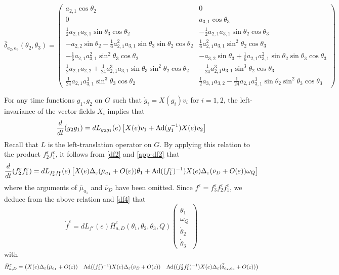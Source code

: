 \documentclass[a4paper,twoside]{article}
\def \Ad {\textnormal{Ad}}
\def \eps {\varepsilon}
\begin{document}
\begin{equation}
\label{bdelta}
 \bar \delta_{a_2,a_3}(\theta_2,\theta_3)=
\begin{pmatrix}
a_{2,1} \cos \theta_2 &  0 \\
0 & a_{3,1} \cos \theta_3 \\
\frac{1}{2} a_{2,1} a_{3,1} \sin \theta_3 \cos \theta_2  & -\frac{1}{2} a_{2,1} a_{3,1} \sin \theta_2 \cos \theta_3 \\
-a_{2,2} \sin \theta_2  -\frac{1}{6} a_{2,1}^2 a_{3,1} \sin \theta_3 \sin \theta_2 \cos \theta_2  &
\frac{1}{6} a_{2,1}^2 a_{3,1} \sin^2 \theta_2 \cos \theta_3 \\ 
-\frac{1}{6} a_{2,1} a_{3,1}^2 \sin^2 \theta_3 \cos \theta_2   & 
-a_{3,2} \sin \theta_3 + \frac{1}{6} a_{2,1}a_{3,1}^2 \sin \theta_2 \sin\theta_3 \cos \theta_3 \\
\frac{1}{2} a_{2,1} a_{2,2} +\frac{1}{24} a_{2,1}^3 a_{3,1} \sin \theta_3 \sin^2 \theta_2 \cos \theta_2 &
-\frac{1}{24} a_{2,1}^3 a_{3,1}  \sin^3 \theta_2 \cos \theta_3  \\
\frac{1}{24}  a_{2,1}a_{3,1}^3 \sin^3 \theta_3 \cos \theta_2 &
\frac{1}{2} a_{3,1} a_{3,2} -\frac{1}{24} a_{2,1} a_{3,1}^3 \sin \theta_2 \sin^2 \theta_3 \cos \theta_3 
\end{pmatrix}
\end{equation}
\vspace*{.2cm}

\noindent {\bf Expression of $\dot f^\eps$:}

For any time functions $g_1, g_2$ on $G$ such that $\dot g_i = X(g_i) v_i$ for $i=1,2$,
the left-invariance of the vector fields $X_i$ implies that
\[
\frac{d}{dt}(g_2 g_1) = dL_{g_2 g_1}(e) \left[ X(e) v_1+\Ad(g_1^{-1}) X(e) v_2 \right]
\]
Recall that $L$ is the left-translation operator on $G$.
By applying this relation to the product $f_2^\eps f_1^\eps$, it follows from \eqref{df2} and \eqref{app-df2} that
\begin{equation}
\label{df32}
\frac{d}{dt} (f_2^\eps f_1^\eps) = dL_{f_2^\eps f_1^\eps}(e)  \left[ X(e) \Delta_\eps (\bar \mu_{a_1}+O(\eps)) \dot \theta_1 
+\Ad((f_1^\eps)^{-1})X(e) \Delta_\eps (\bar \nu_{D}+O(\eps)) \omega_Q \right]
\end{equation}
where the arguments of $\bar \mu_{a_1}$ and $\bar \nu_{D}$ have been omitted. 
Since $f^\eps= f_3^\eps f_2^\eps f_1^\eps$, we deduce from the above relation and \eqref{df4} that
\begin{equation}
\label{df}
\dot f^\eps = dL_{f^\eps}(e) \bar H_{a,D}^\eps(\theta_1,\theta_2, \theta_3,Q) 
\begin{pmatrix}
\dot \theta_1 \\
\omega_Q \\
\dot \theta_2 \\
\dot \theta_3
\end{pmatrix}
\end{equation}
with
\begin{equation}
\label{defhb}
\bar H_{a,D}^\eps=
\left(
X(e) \Delta_\eps (\bar \mu_{a_1}+O(\eps)) \quad  \Ad((f_1^\eps)^{-1}) X(e) \Delta_\eps (\bar \nu_{D}+O(\eps)) \quad
\Ad((f_2^\eps f_1^\eps)^{-1}) X(e)  \Delta_\eps (\bar \delta_{a_2,a_3}+O(\eps)) 
\right)
\end{equation}
\end{document}
